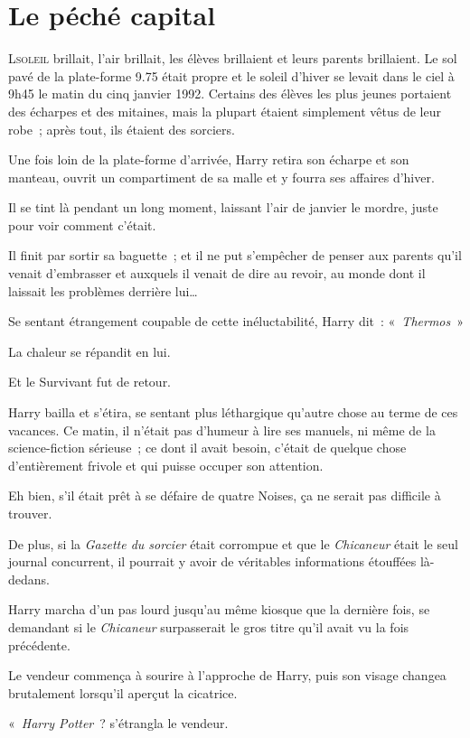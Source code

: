 \chapter{Le péché capital}

\lettrine{L}{soleil} brillait, l'air brillait, les élèves brillaient et leurs parents brillaient. Le sol pavé de la plate-forme 9.75 était propre et le soleil d'hiver se levait dans le ciel à 9h45 le matin du cinq janvier 1992. Certains des élèves les plus jeunes portaient des écharpes et des mitaines, mais la plupart étaient simplement vêtus de leur robe~; après tout, ils étaient des sorciers.

Une fois loin de la plate-forme d'arrivée, Harry retira son écharpe et son manteau, ouvrit un compartiment de sa malle et y fourra ses affaires d'hiver.

Il se tint là pendant un long moment, laissant l'air de janvier le mordre, juste pour voir comment c'était.

Il finit par sortir sa baguette~; et il ne put s'empêcher de penser aux parents qu'il venait d'embrasser et auxquels il venait de dire au revoir, au monde dont il laissait les problèmes derrière lui…

Se sentant étrangement coupable de cette inéluctabilité, Harry dit~: «~\emph{Thermos}~»

La chaleur se répandit en lui.

Et le Survivant fut de retour.

Harry bailla et s'étira, se sentant plus léthargique qu'autre chose au terme de ces vacances. Ce matin, il n'était pas d'humeur à lire ses manuels, ni même de la science-fiction sérieuse~; ce dont il avait besoin, c'était de quelque chose d'entièrement frivole et qui puisse occuper son attention.

Eh bien, s'il était prêt à se défaire de quatre Noises, ça ne serait pas difficile à trouver.

De plus, si la \emph{Gazette du sorcier} était corrompue et que le \emph{Chicaneur} était le seul journal concurrent, il pourrait y avoir de véritables informations étouffées là-dedans.

Harry marcha d'un pas lourd jusqu'au même kiosque que la dernière fois, se demandant si le \emph{Chicaneur} surpasserait le gros titre qu'il avait vu la fois précédente.

Le vendeur commença à sourire à l'approche de Harry, puis son visage changea brutalement lorsqu'il aperçut la cicatrice.

«~\emph{Harry Potter}~? s'étrangla le vendeur.

